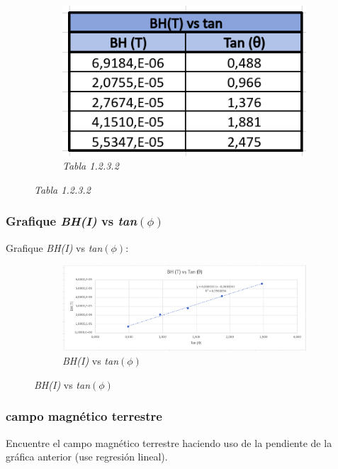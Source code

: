 \begin{figure}[H]
    \centering
    \begin{subfigure}[b]{0.6\textwidth}
        \centering
        \includegraphics[width=\textwidth]{Figures/0. General/2.3.2.png}
        \caption{\textit{Tabla 1.2.3.2}}
    \end{subfigure}
\end{figure}



\subsubsection{Grafique \textit{BH(I)} vs \textit{tan\((\phi)\)}}
Grafique \textit{BH(I)} vs \textit{tan\((\phi)\)}:

\begin{figure}[H]
    \centering
    \begin{subfigure}[b]{\textwidth}
        \centering
        \includegraphics[width=\textwidth]{Figures/0. General/2.4.png}
        \caption{\textit{BH(I)} vs \textit{tan\((\phi)\)}}
    \end{subfigure}
\end{figure}


\subsubsection{campo magnético terrestre}
Encuentre el campo magnético terrestre haciendo uso de la pendiente de la
gráfica anterior (use regresión lineal).\\

